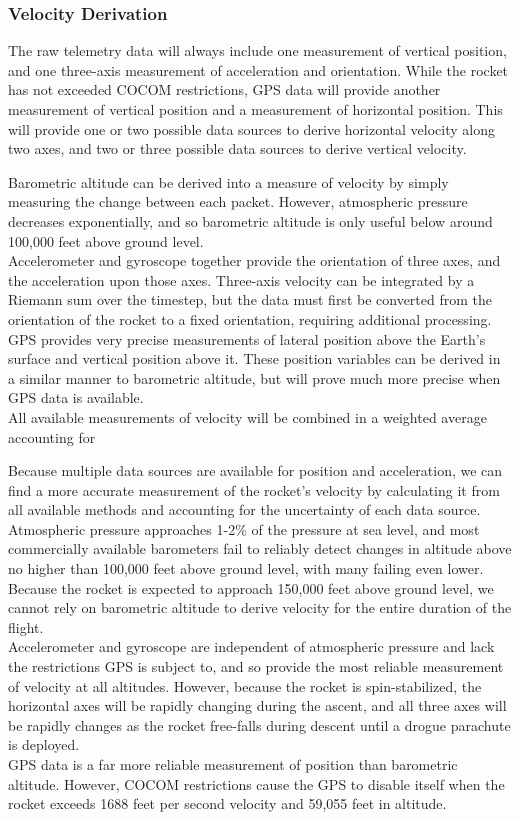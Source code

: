 \documentclass[onecolumn, draftclsnofoot,10pt, compsoc]{IEEEtran}
\begin{document}
\subsubsection{Velocity Derivation}
The raw telemetry data will always include one measurement of vertical position, and one three-axis measurement of acceleration and orientation.
While the rocket has not exceeded COCOM restrictions, GPS data will provide another measurement of vertical position and a measurement of horizontal position.
This will provide one or two possible data sources to derive horizontal velocity along two axes, and two or three possible data sources to derive vertical velocity.

Barometric altitude can be derived into a measure of velocity by simply measuring the change between each packet.
However, atmospheric pressure decreases exponentially, and so barometric altitude is only useful below around 100,000 feet above ground level.\\
\noindent
Accelerometer and gyroscope together provide the orientation of three axes, and the acceleration upon those axes.
Three-axis velocity can be integrated by a Riemann sum over the timestep, but the data must first be converted from the orientation of the rocket to a fixed orientation, requiring additional processing.\\
\noindent
GPS provides very precise measurements of lateral position above the Earth's surface and vertical position above it.
These position variables can be derived in a similar manner to barometric altitude, but will prove much more precise when GPS data is available.\\
\noindent
All available measurements of velocity will be combined in a weighted average accounting for 

Because multiple data sources are available for position and acceleration, we can find a more accurate measurement of the rocket's velocity by calculating it from all available methods and accounting for the uncertainty of each data source.\\
\noindent
Atmospheric pressure approaches 1-2\% of the pressure at sea level, and most commercially available barometers fail to reliably detect changes in altitude above no higher than 100,000 feet above ground level, with many failing even lower.
Because the rocket is expected to approach 150,000 feet above ground level, we cannot rely on barometric altitude to derive velocity for the entire duration of the flight.\\
\noindent
Accelerometer and gyroscope are independent of atmospheric pressure and lack the restrictions GPS is subject to, and so provide the most reliable measurement of velocity at all altitudes.
However, because the rocket is spin-stabilized, the horizontal axes will be rapidly changing during the ascent, and all three axes will be rapidly changes as the rocket free-falls during descent until a drogue parachute is deployed.\\
\noindent
GPS data is a far more reliable measurement of position than barometric altitude.
However, COCOM restrictions cause the GPS to disable itself when the rocket exceeds 1688 feet per second velocity and 59,055 feet in altitude.
\end{document}
